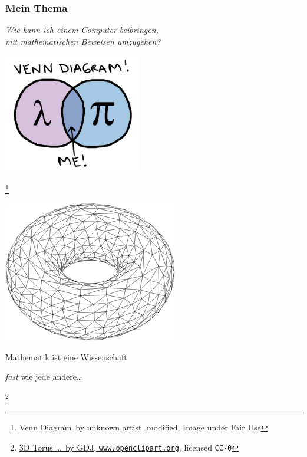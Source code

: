 \documentclass[aspectratio=43]{beamer}
\newcommand\blfootnote[1]{%
  \begingroup
  \renewcommand\thefootnote{}\footnote{#1}%
  \addtocounter{footnote}{-1}%
  \endgroup
}
\begin{document}

\begin{frame}
\frametitle{Mein Thema}

\begin{center}
\emph{Wie kann ich einem Computer beibringen,\\ mit mathematischen Beweisen umzugehen?}
\bigskip\bigskip

\includegraphics[width=0.45\textwidth]{images/venn-diagram.jpg} 
\end{center}

\blfootnote{\glqq Venn Diagram\grqq\ by unknown artist, modified, Image under Fair Use}
\end{frame}


\begin{frame}
 
\vspace{40pt}

\begin{center}
\includegraphics[scale=0.5]{images/torus.png}
\bigskip\bigskip

Mathematik ist eine Wissenschaft

\emph{fast} wie jede andere\dots
\end{center}

\blfootnote{\href{https://openclipart.org/detail/277014/3d-torus-rotated-wireframe-2}{\glqq 3D Torus \dots\grqq\ by GDJ, \texttt{www.openclipart.org}}, licensed \texttt{CC-0}}

\end{frame}
\end{document}
